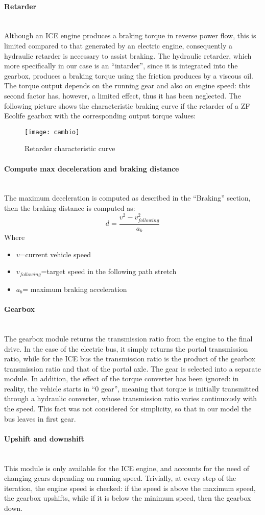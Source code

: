 \documentclass{article}
\newcommand{\subsubsubsection}[1]{\paragraph{#1}\mbox{}\\}
\begin{document}
\subsubsubsection{Retarder}
Although an ICE engine produces a braking torque in reverse power flow, this is limited compared to that generated by an electric engine, consequently a hydraulic retarder is necessary to assist braking. The hydraulic retarder, which more specifically in our case is an “intarder”, since it is integrated into the gearbox, produces a braking torque using the friction produces by a viscous oil. The torque output depends on the running gear and also on engine speed: this second factor has, however, a limited effect, thus it has been neglected. The following picture shows the characteristic braking curve if the retarder of a ZF Ecolife gearbox with the corresponding output torque values: \\
\begin{figure}[H]
\centering
\texttt{[image: cambio]}
\caption{Retarder characteristic curve}
\end{figure} 
\subsubsubsection{Compute max deceleration and braking distance}
The maximum deceleration is computed as described in the “Braking” section, then the braking distance is computed as: 
\begin{equation}
d=\frac{v^2-v^{2}_{following}}{a_b}
\end{equation}
Where
\begin{itemize}
\item $v$=current vehicle speed 
\item $v_{following}$=target speed in the following path stretch 
\item $a_b$= maximum braking acceleration 
\end{itemize}
\subsubsubsection{Gearbox}
The gearbox module returns the transmission ratio from the engine to the final drive. In the case of the electric bus, it simply returns the portal transmission ratio, while for the ICE bus the transmission ratio is the product of the gearbox transmission ratio and that of the portal axle. The gear is selected into a separate module. In addition, the effect of the torque converter has been ignored: in reality, the vehicle starts in “0 gear”, meaning that torque is initially transmitted through a hydraulic converter, whose transmission ratio varies continuously with the speed. This fact was not considered for simplicity, so that in our model the bus leaves in first gear.\\

\subsubsubsection{Upshift and downshift}
This module is only available for the ICE engine, and accounts for the need of changing gears depending on running speed. Trivially, at every step of the iteration, the engine speed is checked: if the speed is above the maximum speed, the gearbox upshifts, while if it is below the minimum speed, then the gearbox down.\\
\end{document}
